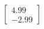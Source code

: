 \documentclass[preview]{standalone}
\begin{document}
\begin{align*}
\begin{bmatrix} 4.99 \\ -2.99 \end{bmatrix}
\end{align*}
\end{document}
